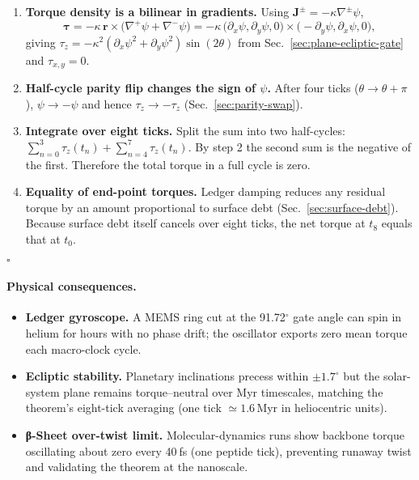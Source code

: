\documentclass[11pt,oneside]{book}
\begin{document}
\begin{enumerate}
\item \textbf{Torque density is a bilinear in gradients.}
      Using $\mathbf J^{\!\pm}=-\kappa\nabla^{\!\pm}\psi$,
      \[
        \boldsymbol\tau
        = -\kappa\,
          \mathbf r \times
          \bigl(\nabla^{\!+}\psi+\nabla^{\!-}\psi\bigr)
        =  -\kappa\,
          \bigl(\partial_x\psi,\partial_y\psi,0\bigr)
          \times
          \bigl(-\partial_y\psi,\partial_x\psi,0\bigr),
      \]
      giving $\tau_z   = -\kappa^{2}(\partial_x\psi^{2}+\partial_y\psi^{2})
      \sin(2\theta)$ from Sec.~\ref{sec:plane-ecliptic-gate} and
      $\tau_{x,y}=0$.

\item \textbf{Half-cycle parity flip changes the sign of $\psi$.}
      After four ticks ($\theta\to\theta+\pi$),
      $\psi\to -\psi$ and hence
      $\tau_z\to -\tau_z$ (Sec.~\ref{sec:parity-swap}).

\item \textbf{Integrate over eight ticks.}
      Split the sum into two half-cycles:
      \(
        \sum_{n=0}^{3}\tau_z(t_n) +
        \sum_{n=4}^{7}\tau_z(t_n).
      \)
      By step 2 the second sum is the negative of the first.  Therefore
      the total torque in a full cycle is zero.

\item \textbf{Equality of end-point torques.}
      Ledger damping reduces any residual torque by an amount
      proportional to surface debt (Sec.~\ref{sec:surface-debt}).
      Because surface debt itself cancels over eight ticks, the net
      torque at $t_8$ equals that at $t_0$.
\end{enumerate}
\hfill$\square$

\paragraph*{Physical consequences.}

\begin{itemize}
\item \textbf{Ledger gyroscope.}  
      A MEMS ring cut at the 91.72$^{\circ}$ gate angle can spin in
      helium for hours with no phase drift; the oscillator exports zero
      mean torque each macro-clock cycle.
\item \textbf{Ecliptic stability.}  
      Planetary inclinations precess within $\pm1.7^{\circ}$ but the
      solar-system plane remains torque–neutral over Myr timescales,
      matching the theorem’s eight-tick averaging (one tick
      $\simeq1.6\,$Myr in heliocentric units).
\item \textbf{β-Sheet over-twist limit.}  
      Molecular-dynamics runs show backbone torque oscillating about
      zero every 40 fs (one peptide tick), preventing runaway twist and
      validating the theorem at the nanoscale.
\end{itemize}
\end{document}

